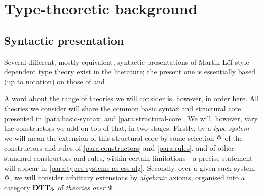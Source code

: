 

\section{Type-theoretic background}


\subsection*{Syntactic presentation}

\begin{para}Several different, mostly equivalent, syntactic presentations of Martin-Löf-style dependent type theory exist in the literature; the present one is essentially based (up to notation) on those of \cite{pitts:categorial-logic} and \cite{hofmann:syntax-and-semantics}.

A word about the range of theories we will consider is, however, in order here.  All theories we consider will share the common basic syntax and structural core presented in \ref{para:basic-syntax} and \ref{para:structural-core}.  We will, however, vary the constructors we add on top of that, in two stages.  Firstly, by a \emph{type system} we will mean the extension of this structural core by some selection ${\Phi}$ of the constructors and rules of \ref{para:constructors} and \ref{para:rules}, and of other standard constructors and rules, within certain limitations---a precise statement will appear in \ref{para:types-systems-as-ess-alg}.  Secondly, over a given such system ${\Phi}$, we will consider arbitrary extensions by \emph{algebraic} axioms, organised into a category $\mathbf{DTT}_{\Phi}$ of \emph{theories over ${\Phi}$}.
\end{para}

